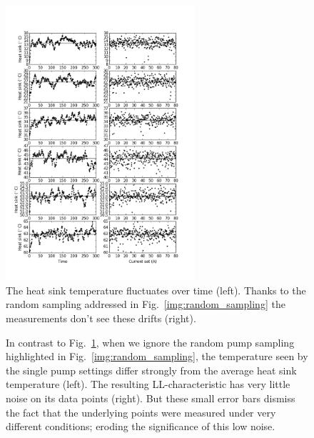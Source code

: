 \begin{figure}
\centering
\includegraphics[width=7cm]{img/random_sampling_heatsink.png}
\caption{The heat sink temperature fluctuates over time (left).
Thanks to the random sampling addressed in Fig.~\ref{img:random_sampling}
the measurements don't see these drifts (right).}
\label{img:random_sampling_heatsink}
\end{figure}

\begin{figure}
\centering
{}
\caption{In contrast to Fig.~\ref{img:random_sampling_heatsink},
when we ignore the random pump sampling
highlighted in Fig.~\ref{img:random_sampling},
the temperature seen by the single pump settings
differ strongly from the average heat sink temperature
(left).
The resulting LL-characteristic
has very little noise on its data points
(right).
But these small error bars dismiss the fact
that the underlying points were measured
under very different conditions;
eroding the significance
of this low noise.}
\label{img:random_sampling_ramp_heatsink}
\end{figure}

